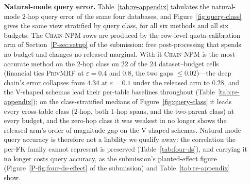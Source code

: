 \documentclass[sigconf, nonacm]{acmart}
\newcommand{\chainnpm}{\textsc{Chain-NPM}\xspace}
\newcommand{\privmrf}{\textsc{PrivMRF}\xspace}
\newcommand{\psec}[1]{Section~\ref{P-sec:#1} of the submission}
\newcommand{\pfig}[1]{Figure~\ref{P-fig:#1} of the submission}
\begin{document}
\textbf{Natural-mode query error.} Table~\ref{tab:re-appendix} tabulates the
natural-mode $2$-hop query error of the same four databases, and
Figure~\ref{fig:query-class} gives the same view stratified by query class,
for all six methods and all six budgets. The \chainnpm{} rows are produced by
the row-level quota-calibration arm of \psec{setup}: free post-processing
that spends no budget and changes no released marginal. With it \chainnpm{} is
the most accurate method on the $2$-hop class on $22$ of the $24$
dataset--budget cells (financial ties \privmrf{} at
$\varepsilon{=}0.4$ and $0.8$, the two gaps $\le 0.02$)---the deep
chain's error collapses from $4.34$ at $\varepsilon{=}0.1$ under the released
arm to $0.28$, and the V-shaped schemas lead their per-table baselines
throughout (Table~\ref{tab:re-appendix}); on the class-stratified medians of
Figure~\ref{fig:query-class} it leads every cross-table class ($2$-hop,
both $1$-hop spans, and the two-parent class) at every budget, and the
zero-hop class it was weakest in no longer shows the released arm's
order-of-magnitude gap on the V-shaped schemas. Natural-mode query accuracy
is therefore not a liability we qualify away: the correlation the per-FK
family cannot represent is preserved (Table~\ref{tab:four-ds}), and
carrying
it no longer costs query accuracy, as the submission's planted-effect
figure (\pfig{four-ds-effect}) and Table~\ref{tab:re-appendix}
show.
\end{document}
